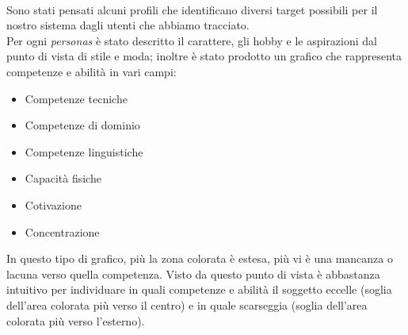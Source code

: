 \documentclass[12pt,a4paper]{report}
\begin{document}
\paragraph{}Sono stati pensati alcuni profili che identificano diversi target possibili per il nostro sistema dagli utenti che abbiamo tracciato.\\
Per ogni \textit{personas} è stato descritto il carattere, gli hobby e le aspirazioni dal punto di vista di stile e moda; inoltre è stato prodotto un grafico che rappresenta competenze e abilità in vari campi:
\begin{itemize}
  \item Competenze tecniche
  \item Competenze di dominio
  \item Competenze linguistiche
  \item Capacità fisiche
  \item Cotivazione
  \item Concentrazione
\end{itemize}
In questo tipo di grafico, più la zona colorata è estesa, più vi è una mancanza o lacuna verso quella competenza. Visto da questo punto di vista è abbastanza intuitivo per individuare in quali competenze e abilità il soggetto eccelle (soglia dell'area colorata più verso il centro) e in quale scarseggia (soglia dell'area colorata più verso l'esterno).
\end{document}
